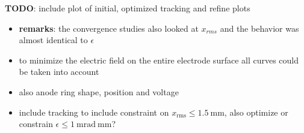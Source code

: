 %       
%       

\textbf{TODO}: include plot of initial, optimized tracking and refine plots

\begin{itemize}
   \item \textbf{remarks}: the convergence studies also looked at $x_{rms}$ and the behavior was almost identical to $\epsilon$

   \item to minimize the electric field on the entire electrode surface all curves could be taken into account
   \item also anode ring shape, position and voltage
   \item include tracking to include constraint on $x_\mathrm{rms} \leq 1.5\ \mathrm{mm}$, also optimize or constrain $\epsilon \leq 1\ \mathrm{mrad\ mm}$?
\end{itemize}
